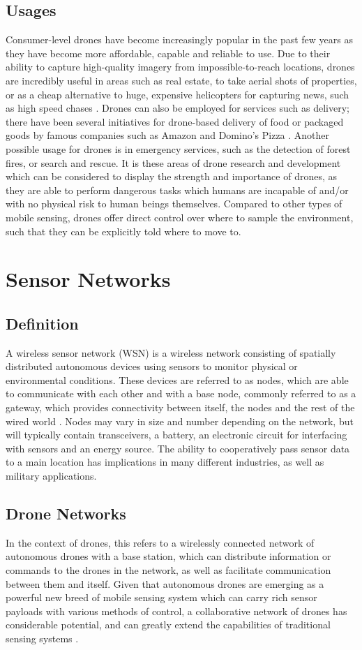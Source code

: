\documentclass[12pt,a4paper,twoside]{report}
\begin{document}
		\subsection{Usages}
		Consumer-level drones have become increasingly popular in the past few years as they have become more affordable, capable and reliable to use. Due to their ability to capture high-quality imagery from impossible-to-reach locations, drones are incredibly useful in areas such as real estate, to take aerial shots of properties, or as a cheap alternative to huge, expensive helicopters for capturing news, such as high speed chases \citep{josephdussault2014}. Drones can also be employed for services such as delivery; there have been several initiatives for drone-based delivery of food or packaged goods by famous companies such as Amazon and Domino's Pizza \citep{marcusfaires2015}. Another possible usage for drones is in emergency services, such as the detection of forest fires, or search and rescue. It is these areas of drone research and development which can be considered to display the strength and importance of drones, as they are able to perform dangerous tasks which humans are incapable of and/or with no physical risk to human beings themselves. Compared to other types of mobile sensing, drones offer direct control over where to sample the environment, such that they can be explicitly told where to move to.
	\section{Sensor Networks}
		\subsection{Definition}
		A wireless sensor network (WSN) is a wireless network consisting of spatially distributed autonomous devices using sensors to monitor physical or environmental conditions. These devices are referred to as nodes, which are able to communicate with each other and with a base node, commonly referred to as a gateway, which provides connectivity between itself, the nodes and the rest of the wired world \citep{ nationalinstruments2012}. Nodes may vary in size and number depending on the network, but will typically contain transceivers, a battery, an electronic circuit for interfacing with sensors and an energy source.  The ability to cooperatively pass sensor data to a main location has implications in many different industries, as well as military applications.
		\subsection{Drone Networks}
		In the context of drones, this refers to a wirelessly connected network of autonomous drones with a base station, which can distribute information or commands to the drones in the network, as well as facilitate communication between them and itself.  Given that autonomous drones are emerging as a powerful new breed of mobile sensing system which can carry rich sensor payloads with various methods of control, a collaborative network of drones has considerable potential, and can greatly extend the capabilities of traditional sensing systems \citep{lucamottola2014}. 
\end{document}
